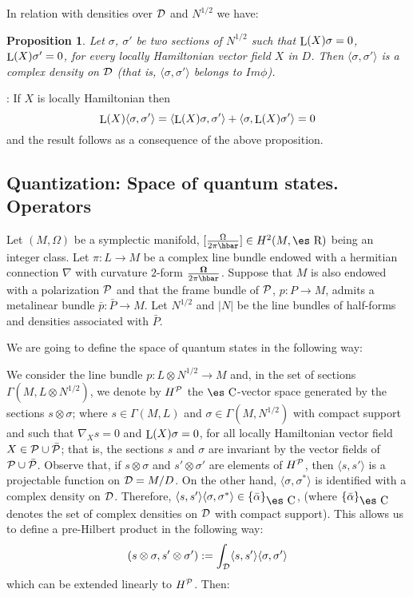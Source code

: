 \documentclass[12pt]{article}
\theoremstyle{plain}
\newtheorem{prop}{Proposition}
\def\beq{\begin{equation}}
\def\eeq{\end{equation}}
\def\qed{\ifvmode\removelastskip\fi
{\unskip\nobreak\hfil\penalty50\hbox{}\nobreak\hfil
\hbox{\vrule height1.2ex width1.2ex}\parfillskip=0pt
\finalhyphendemerits=0 \par\smallskip}}
\def\Real{\mbox{\es R}}
\def\Complex{\mbox{\es C}}
\def\Lie{\mathop{\rm L}\nolimits}
\begin{document}
In relation with densities over ${\cal D}$ and $N^{1/2}$ we have:

\begin{prop}
Let $\sigma$, $\sigma '$ be two sections of $N^{1/2}$
such that $\Lie(X)\sigma = 0$, $\Lie(X)\sigma ' = 0$,
for every locally Hamiltonian vector field $X$ in $D$.
Then $\langle \sigma ,\sigma ' \rangle$ is a complex density on ${\cal
D}$
(that is, $\langle \sigma ,\sigma ' \rangle$ belongs to $Im \phi$).
\end{prop}%
: 
If $X$ is locally Hamiltonian then
$$
\Lie(X)\langle \sigma ,\sigma ' \rangle =
\langle \Lie(X)\sigma ,\sigma ' \rangle +
\langle \sigma ,\Lie(X)\sigma ' \rangle = 0
$$
and the result follows as a consequence of the above proposition.
\qed




\subsection{Quantization: Space of quantum states. Operators}


Let $(M,\Omega )$ be a symplectic manifold,
$[\frac{\Omega}{2\pi\hbar}] \in H^2(M,\Real )$ being an integer class.
Let $\pi \colon L \to M$ be a complex line bundle endowed with a
hermitian connection $\nabla$ with curvature $2$-form
$\frac{{\bf \Omega}}{2\pi\hbar}$.
Suppose that $M$ is also endowed with a polarization ${\cal P}$ and that
the
frame bundle of ${\cal P}$, $p \colon P \to M$,
admits a metalinear bundle $\bar p \colon \bar P \to M$.
Let $N^{1/2}$ and $|N|$ be the line bundles of half-forms and densities
associated with $\bar P$.

We are going to define the space of quantum states in the following way:

We consider the line bundle $p \colon L \otimes N^{1/2} \to M$
and, in the set of sections $\Gamma (M,L \otimes N^{1/2})$, we
denote by $H^{\cal P}$ the $\Complex$-vector space generated by
the sections $s \otimes \sigma$; where $s \in \Gamma (M,L)$ and
$\sigma \in \Gamma (M,N^{1/2})$ with compact support and such that
$\nabla_Xs = 0$ and $\Lie(X)\sigma = 0$, for all locally
Hamiltonian vector field $X \in {\cal P} \cup \bar {\cal P}$; that
is, the sections $s$ and $\sigma$ are invariant by the vector
fields of ${\cal P} \cup \bar {\cal P}$. Observe that, if $s
\otimes \sigma$ and $s' \otimes \sigma '$ are elements of $H^{\cal
P}$, then $\langle s,s' \rangle$ is a projectable function on
${\cal D} = M/D$. On the other hand, $\langle \sigma ,\sigma^*
\rangle$ is identified with a complex density on ${\cal D}$.
Therefore, $\langle s,s' \rangle \langle \sigma ,\sigma^* \rangle
\in \{ \bar \alpha \}_{\Complex}$, (where  $\{ \bar \alpha
\}_{\Complex}$ denotes the set of complex densities on ${\cal D}$
with compact support). This allows us to define a pre-Hilbert
product in the following way: \beq (s \otimes \sigma ,s' \otimes
\sigma ') := \int_{{\cal D}} \langle s,s' \rangle \langle \sigma
,\sigma ' \rangle \label{herprod} \eeq which can be extended
linearly to $H^{\cal P}$. Then:
\end{document}
